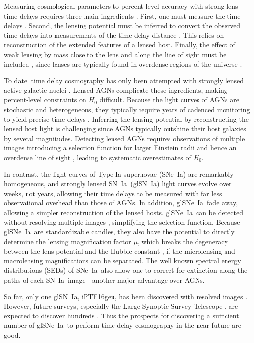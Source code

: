 \documentclass[iop,apj,numberedappendix,twocolappendix]{emulateapj}
\newcommand{\snia}{{\rm SN~Ia}}
\newcommand{\sneia}{{\rm SNe~Ia}}
\begin{document}
Measuring cosmological parameters to percent level accuracy with strong lens time delays requires three main ingredients \citep{suyu17}. 
First, one must measure the time delays \citep[e.g.][]{tewes13,bonvin17}. 
Second, the lensing potential must be inferred to convert the observed time delays into measurements of the time delay distance \citep[e.g.,][]{wong17}. 
This relies on reconstruction of the extended features of a lensed host. 
Finally, the effect of weak lensing by mass close to the lens and along the line of sight must be included \citep[e.g.,][]{suyu10,collett13,rusu17,mccully17}, since lenses are typically found in overdense regions of the universe \citep{fassnacht11}.

To date, time delay cosmography has only been attempted with strongly lensed active galactic nuclei \citep[AGNs; e.g.,][]{vuissoz08,suyu13,tewes13,bonvin16}. 
Lensed AGNs complicate these ingredients, making percent-level constraints on $H_0$ difficult. 
Because the light curves of AGNs are stochastic and heterogeneous, they typically require years of cadenced monitoring to yield precise time delays \citep{tdc}. 
Inferring the lensing potential by reconstructing the lensed host light is challenging since AGNs typically outshine their host galaxies by several magnitudes.
Detecting lensed AGNs requires observations of multiple images introducing a selection function for larger Einstein radii and hence an overdense line of sight \citep{collettcunnington16}, leading to systematic overestimates of $H_0$.

In contrast, the light curves of Type Ia supernovae (\sneia) are remarkably homogeneous, and strongly lensed \snia\ (gl\snia) light curves evolve over weeks, not years, allowing their time delays to be measured with far less observational overhead than those of AGNs. 
In addition, gl\sneia\ fade away, allowing a simpler reconstruction of the lensed hosts. 
gl\sneia\ can be detected without resolving multiple images \citep{goobar16}, simplifying the selection function.
Because gl\sneia\ are standardizable candles, they also have the potential to directly determine the lensing magnification factor $\mu$, which breaks the degeneracy between the lens potential and the Hubble constant \citep{oguri03}, if the microlensing and macrolensing magnifications can be separated.
The well known spectral energy distributions (SEDs) of \sneia\ also allow one to correct for extinction along the paths of each \snia\ image---another major advantage over AGNs.

So far, only one gl\snia, iPTF16geu, has been discovered with resolved images \citep{goobar16}. 
However, future surveys, especially the Large Synoptic Survey Telescope \citep[LSST;][]{lsst}, are expected to discover hundreds \citep{gn17}.
Thus the prospects for discovering a sufficient number of gl\sneia\ to perform time-delay cosmography in the near future are good.
\end{document}
